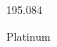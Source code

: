 \documentclass[12pt]{article}
\begin{document}
\hfill{}
\vfill
\begin{center}
  {\fontsize{50}{60}
  }

  195.084

Platinum
\end{center}
\vfill
\end{document}
